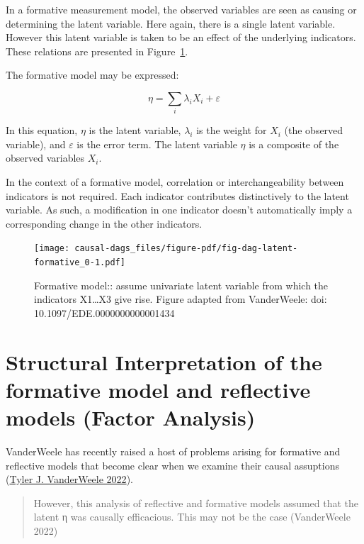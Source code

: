 \documentclass[
  singlecolumn]{report}
\begin{document}
In a formative measurement model, the observed variables are seen as
causing or determining the latent variable. Here again, there is a
single latent variable. However this latent variable is taken to be an
effect of the underlying indicators. These relations are presented in
Figure~\ref{fig-dag-latent-formative_0}.

The formative model may be expressed:

\[\eta = \sum_i\lambda_i X_i + \varepsilon\]

In this equation, \(\eta\) is the latent variable, \(\lambda_i\) is the
weight for \(X_i\) (the observed variable), and \(\varepsilon\) is the
error term. The latent variable \(\eta\) is a composite of the observed
variables \(X_i\).

In the context of a formative model, correlation or interchangeability
between indicators is not required. Each indicator contributes
distinctively to the latent variable. As such, a modification in one
indicator doesn't automatically imply a corresponding change in the
other indicators.

\begin{figure}

{\centering \texttt{[image: causal-dags\_files/figure-pdf/fig-dag-latent-formative\_0-1.pdf]}

}

\caption{\label{fig-dag-latent-formative_0}Formative model:: assume
univariate latent variable from which the indicators X1\ldots X3 give
rise. Figure adapted from VanderWeele: doi:
10.1097/EDE.0000000000001434}

\end{figure}

\hypertarget{structural-interpretation-of-the-formative-model-and-reflective-models-factor-analysis}{%
\section{Structural Interpretation of the formative model and reflective
models (Factor
Analysis)}\label{structural-interpretation-of-the-formative-model-and-reflective-models-factor-analysis}}

VanderWeele has recently raised a host of problems arising for formative
and reflective models that become clear when we examine their causal
assuptions (\protect\hyperlink{ref-vanderweele2022}{Tyler J. VanderWeele
2022}).

\begin{quote}
However, this analysis of reflective and formative models assumed that
the latent η was causally efficacious. This may not be the case
(VanderWeele 2022)
\end{quote}
\end{document}
